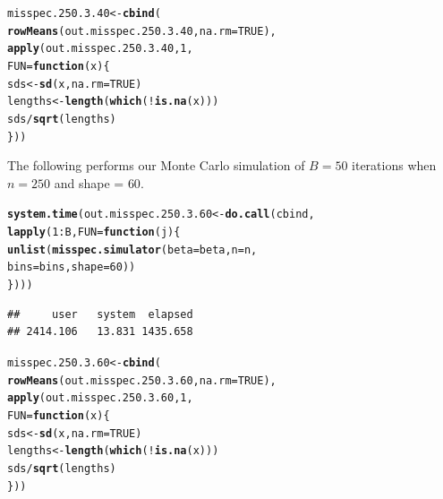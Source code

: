 \documentclass[11pt]{article}\usepackage[]{graphicx}\usepackage[]{color}
\makeatletter
\newcommand{\hlnum}[1]{\textcolor[rgb]{0.686,0.059,0.569}{#1}}%
\newcommand{\hlopt}[1]{\textcolor[rgb]{0,0,0}{#1}}%
\newcommand{\hlstd}[1]{\textcolor[rgb]{0.345,0.345,0.345}{#1}}%
\newcommand{\hlkwa}[1]{\textcolor[rgb]{0.161,0.373,0.58}{\textbf{#1}}}%
\newcommand{\hlkwb}[1]{\textcolor[rgb]{0.69,0.353,0.396}{#1}}%
\newcommand{\hlkwc}[1]{\textcolor[rgb]{0.333,0.667,0.333}{#1}}%
\newcommand{\hlkwd}[1]{\textcolor[rgb]{0.737,0.353,0.396}{\textbf{#1}}}%
\newenvironment{kframe}{%
 \def\at@end@of@kframe{}%
 \ifinner\ifhmode%
  \def\at@end@of@kframe{\end{minipage}}%
  \begin{minipage}{\columnwidth}%
 \fi\fi%
 \def\FrameCommand##1{\hskip\@totalleftmargin \hskip-\fboxsep
 \colorbox{shadecolor}{##1}\hskip-\fboxsep
     \hskip-\linewidth \hskip-\@totalleftmargin \hskip\columnwidth}%
 \MakeFramed {\advance\hsize-\width
   \@totalleftmargin\z@ \linewidth\hsize
   \@setminipage}}%
 {\par\unskip\endMakeFramed%
 \at@end@of@kframe}
\newenvironment{knitrout}{}{} %
\makeatother
\begin{document}
\begin{knitrout}
\color{fgcolor}\begin{kframe}
\begin{alltt}
\hlstd{misspec.250.3.40} \hlkwb{<-} \hlkwd{cbind}\hlstd{(}
  \hlkwd{rowMeans}\hlstd{(out.misspec.250.3.40,} \hlkwc{na.rm} \hlstd{=} \hlnum{TRUE}\hlstd{),}
  \hlkwd{apply}\hlstd{(out.misspec.250.3.40,} \hlnum{1}\hlstd{,}
  \hlkwc{FUN} \hlstd{=} \hlkwa{function}\hlstd{(}\hlkwc{x}\hlstd{)\{}
    \hlstd{sds} \hlkwb{<-} \hlkwd{sd}\hlstd{(x,} \hlkwc{na.rm} \hlstd{=} \hlnum{TRUE}\hlstd{)}
    \hlstd{lengths} \hlkwb{<-} \hlkwd{length}\hlstd{(}\hlkwd{which}\hlstd{(}\hlopt{!}\hlkwd{is.na}\hlstd{(x)))}
    \hlstd{sds} \hlopt{/} \hlkwd{sqrt}\hlstd{(lengths)}
  \hlstd{\}))}
\end{alltt}
\end{kframe}
\end{knitrout}

The following performs our Monte Carlo simulation of $B = 50$ iterations 
when $n = 250$ and shape = $60$.

\begin{knitrout}
\color{fgcolor}\begin{kframe}
\begin{alltt}
\hlkwd{system.time}\hlstd{(out.misspec.250.3.60} \hlkwb{<-} \hlkwd{do.call}\hlstd{(cbind,}
  \hlkwd{lapply}\hlstd{(}\hlnum{1}\hlopt{:}\hlstd{B,} \hlkwc{FUN} \hlstd{=} \hlkwa{function}\hlstd{(}\hlkwc{j}\hlstd{)\{}
    \hlkwd{unlist}\hlstd{(}\hlkwd{misspec.simulator}\hlstd{(}\hlkwc{beta} \hlstd{= beta,} \hlkwc{n} \hlstd{= n,}
      \hlkwc{bins} \hlstd{= bins,} \hlkwc{shape} \hlstd{=} \hlnum{60}\hlstd{))}
\hlstd{\})))}
\end{alltt}
\begin{verbatim}
##     user   system  elapsed 
## 2414.106   13.831 1435.658
\end{verbatim}
\end{kframe}
\end{knitrout}

\begin{knitrout}
\color{fgcolor}\begin{kframe}
\begin{alltt}
\hlstd{misspec.250.3.60} \hlkwb{<-} \hlkwd{cbind}\hlstd{(}
  \hlkwd{rowMeans}\hlstd{(out.misspec.250.3.60,} \hlkwc{na.rm} \hlstd{=} \hlnum{TRUE}\hlstd{),}
  \hlkwd{apply}\hlstd{(out.misspec.250.3.60,} \hlnum{1}\hlstd{,}
  \hlkwc{FUN} \hlstd{=} \hlkwa{function}\hlstd{(}\hlkwc{x}\hlstd{)\{}
    \hlstd{sds} \hlkwb{<-} \hlkwd{sd}\hlstd{(x,} \hlkwc{na.rm} \hlstd{=} \hlnum{TRUE}\hlstd{)}
    \hlstd{lengths} \hlkwb{<-} \hlkwd{length}\hlstd{(}\hlkwd{which}\hlstd{(}\hlopt{!}\hlkwd{is.na}\hlstd{(x)))}
    \hlstd{sds} \hlopt{/} \hlkwd{sqrt}\hlstd{(lengths)}
  \hlstd{\}))}
\end{alltt}
\end{kframe}
\end{knitrout}
\end{document}
